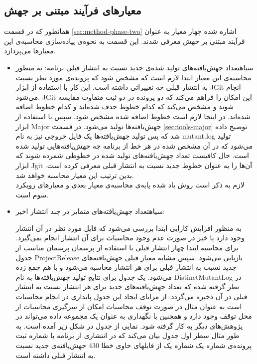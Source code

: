 \subsection{ معیارهای فرآیند مبتنی بر جهش}
همانطور که در قسمت \ref{sec:method-phase-two} اشاره شده چهار معیار  به عنوان فرآیند مبتنی بر جهش معرفی شدند. این قسمت به نحوه‌ی پیاده‌سازی محاسبه‌ی این معیارها می‌پردازد. 
\begin{itemize}
\item
{}‌سیاه{تعداد جهش‌یافته‌های تولید شده‌ی جدید نسبت به انتشار قبلی برنامه:}
به منظور محاسبه‌ی این معیار ابتدا لازم است که مشخص شود که پرونده‌ی مورد نظر نسبت به انتشار قبلی چه تغییراتی داشته است. این کار با استفاده از ابزار JGit انجام  می‌شود. JGit این امکان را فراهم می‌کند که دو پرونده در دو ثبت متفاوت مقایسه شوند و مشخص می‌کند که کدام خطوط حذف شده‌اند و کدام خطوط اضافه شده‌اند. در اینجا لازم است خطوط اضافه شده  مشخص شود. سپس با استفاده از ابزار Major جهش‌یافته‌ها تولید می‌شود. در  قسمت  \ref{sec:tools-major} توضیح داده شد که پس تولید جهش‌یافته‌ها یک فایل خروجی نیز به نام mutant.log تولید می‌شود که در آن مشخص شده در هر خط از برنامه چه جهش‌یافته‌هایی تولید شده است. حال کافیست تعداد جهش‌یافته‌های تولید شده در خطوطی شمرده شوند که ابزار Jgit آن‌ها را به عنوان خطوط جدید نسبت به انتشار قبلی معرفی کرده است. بدین ترتیب این معیار محاسبه خواهد شد.\\
لازم به ذکر است روش یاد شده پایه‌ی محاسبه‌ی معیار بعدی و معیارهای رویکرد سوم است.
\item
{}‌سیاه{تعداد جهش‌یافته‌های متمایز در چند انتشار اخیر:}

 به منظور افزایش کارایی ابتدا بررسی می‌شود که فایل مورد نظر در آن انتشار وجود دارد یا خیر در صورت عدم وجود محاسبات برای آن انتشار انجام نمی‌گیرد.
برای محاسبه ابتدا چهار انتشار قبلی  با استفاده از پرسمان  پرسمان مناسب از جدول ProjectRelease بازیابی می‌شود. سپس مشابه معیار قبلی جهش‌یافته‌های جدید نسبت به انتشار قبلی برای هر انتشار محاسبه می‌شود و با هم جمع زده می‌شود.  یک جدول برای نتایج تولید جهش‌یافته‌ها  به نام  DistinctMutantLog در نظر گرفته شده که تعداد جهش‌یافته‌های جدید برای هر انتشار نسبت به انتشار قبلی در آن ذخیره می‌گردد. از مزایای ایجاد این جدول پایداری در انجام محاسبات است به عنوان مثال  در صورت توقف محاسبات امکان از سرگیری محاسبات از محل توقف وجود  دارد و همچنین  با نگهداری به عنوان یک مجموعه داده می‌تواند در پژوهش‌های دیگر به کار گرفته شود. نمایی از جدول در شکل زیر آمده است. به طور مثال سطر اول جدول بیان می‌کند که در انتشاری از برنامه با شماره ثبت    پرونده‌ی شماره یک شماره یک از فایلهای حاوی خطا 430 جهش‌یافته‌ی جدید نسبت به انتشار قبلی داشته است.

\end{itemize}
